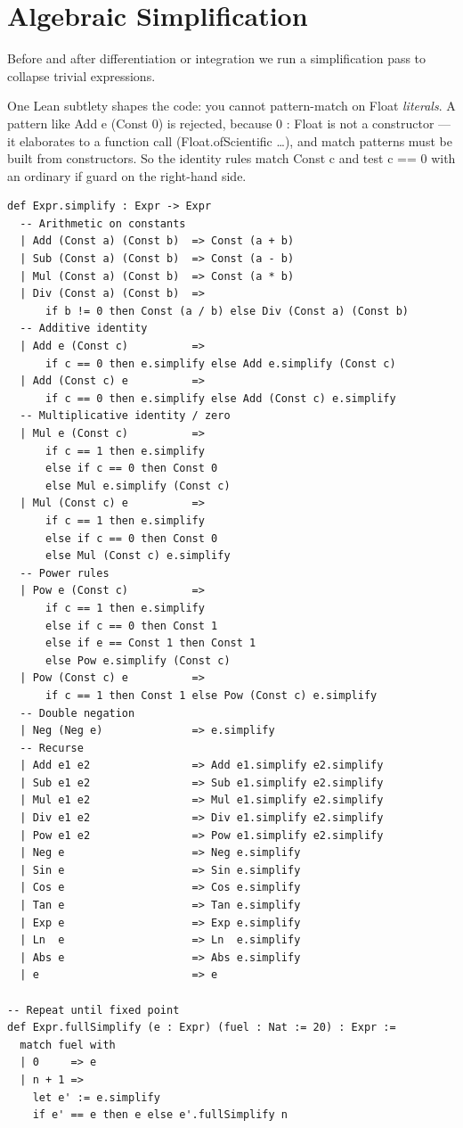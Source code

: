 \documentclass[12pt, openany]{book}
\theoremstyle{plain}
\theoremstyle{definition}
\theoremstyle{remark}
\newcommand{\li}[1]{{\ttfamily\small\color{tealaccent}#1}}
\begin{document}
\section{Algebraic Simplification}

Before and after differentiation or integration we run a simplification pass
to collapse trivial expressions.

One Lean subtlety shapes the code: you cannot pattern-match on \li{Float}
\emph{literals}.  A pattern like \li{Add e (Const 0)} is rejected, because
\li{0 : Float} is not a constructor --- it elaborates to a function call
(\li{Float.ofScientific \ldots}), and match patterns must be built from
constructors.  So the identity rules match \li{Const c} and test
\li{c == 0} with an ordinary \li{if} guard on the right-hand side.

\begin{leanbox}
\begin{lstlisting}
def Expr.simplify : Expr -> Expr
  -- Arithmetic on constants
  | Add (Const a) (Const b)  => Const (a + b)
  | Sub (Const a) (Const b)  => Const (a - b)
  | Mul (Const a) (Const b)  => Const (a * b)
  | Div (Const a) (Const b)  =>
      if b != 0 then Const (a / b) else Div (Const a) (Const b)
  -- Additive identity
  | Add e (Const c)          =>
      if c == 0 then e.simplify else Add e.simplify (Const c)
  | Add (Const c) e          =>
      if c == 0 then e.simplify else Add (Const c) e.simplify
  -- Multiplicative identity / zero
  | Mul e (Const c)          =>
      if c == 1 then e.simplify
      else if c == 0 then Const 0
      else Mul e.simplify (Const c)
  | Mul (Const c) e          =>
      if c == 1 then e.simplify
      else if c == 0 then Const 0
      else Mul (Const c) e.simplify
  -- Power rules
  | Pow e (Const c)          =>
      if c == 1 then e.simplify
      else if c == 0 then Const 1
      else if e == Const 1 then Const 1
      else Pow e.simplify (Const c)
  | Pow (Const c) e          =>
      if c == 1 then Const 1 else Pow (Const c) e.simplify
  -- Double negation
  | Neg (Neg e)              => e.simplify
  -- Recurse
  | Add e1 e2                => Add e1.simplify e2.simplify
  | Sub e1 e2                => Sub e1.simplify e2.simplify
  | Mul e1 e2                => Mul e1.simplify e2.simplify
  | Div e1 e2                => Div e1.simplify e2.simplify
  | Pow e1 e2                => Pow e1.simplify e2.simplify
  | Neg e                    => Neg e.simplify
  | Sin e                    => Sin e.simplify
  | Cos e                    => Cos e.simplify
  | Tan e                    => Tan e.simplify
  | Exp e                    => Exp e.simplify
  | Ln  e                    => Ln  e.simplify
  | Abs e                    => Abs e.simplify
  | e                        => e

-- Repeat until fixed point
def Expr.fullSimplify (e : Expr) (fuel : Nat := 20) : Expr :=
  match fuel with
  | 0     => e
  | n + 1 =>
    let e' := e.simplify
    if e' == e then e else e'.fullSimplify n
\end{lstlisting}
\end{leanbox}
\color{black}
\end{document}
